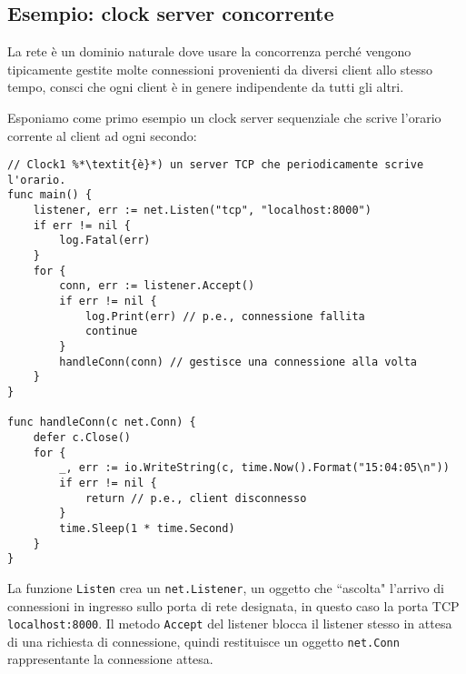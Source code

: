 \documentclass[../../thesis.tex]{subfiles}
\begin{document}
    \subsection{Esempio: clock server concorrente}\label{subsec:esempio:-clock-server-concorrente}
    La rete è un dominio naturale dove usare la concorrenza perché vengono tipicamente gestite molte connessioni provenienti da diversi client allo stesso tempo, consci che ogni client è in genere indipendente da tutti gli altri.
    \hfill \vspace{12pt}

    Esponiamo come primo esempio un clock server sequenziale che scrive l'orario corrente al client ad ogni secondo:
    \begin{lstlisting}[frame = single, label = {lst:lstlisting7-2.1}]
// Clock1 %*\textit{è}*) un server TCP che periodicamente scrive l'orario.
func main() {
    listener, err := net.Listen("tcp", "localhost:8000")
    if err != nil {
        log.Fatal(err)
    }
    for {
        conn, err := listener.Accept()
        if err != nil {
            log.Print(err) // p.e., connessione fallita
            continue
        }
        handleConn(conn) // gestisce una connessione alla volta
    }
}

func handleConn(c net.Conn) {
    defer c.Close()
    for {
        _, err := io.WriteString(c, time.Now().Format("15:04:05\n"))
        if err != nil {
            return // p.e., client disconnesso 
        }
        time.Sleep(1 * time.Second)
    }
}
    \end{lstlisting}
    La funzione \verb"Listen" crea un \verb"net.Listener", un oggetto che ``ascolta" l'arrivo di connessioni in ingresso sullo porta di rete designata, in questo caso la porta TCP \verb"localhost:8000".
    Il metodo \verb"Accept" del listener blocca il listener stesso in attesa di una richiesta di connessione, quindi restituisce un oggetto \verb"net.Conn" rappresentante la connessione attesa.
    \hfill \vspace{12pt}
\end{document}
